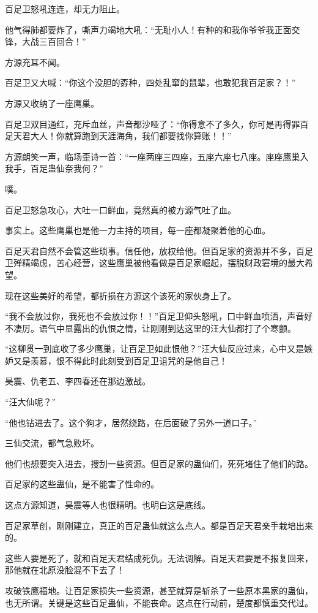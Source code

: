 \begin{this_body}
百足卫怒吼连连，却无力阻止。

他气得肺都要炸了，嘶声力竭地大吼：“无耻小人！有种的和我你爷爷我正面交锋，大战三百回合！”

方源充耳不闻。

百足卫又大喊：“你这个没胆的孬种，四处乱窜的鼠辈，也敢犯我百足家？！”

方源又收纳了一座鹰巢。

百足卫双目通红，充斥血丝，声音都沙哑了：“你得意不了多久，你可是再得罪百足天君大人！你就算跑到天涯海角，我们都要找你算账！！”

方源朗笑一声，临场歪诗一首：“一座两座三四座，五座六座七八座。座座鹰巢入我手，百足蛊仙奈我何？”

噗。

百足卫怒急攻心，大吐一口鲜血，竟然真的被方源气吐了血。

事实上。这些鹰巢也是他一力主持的项目，每一座都凝聚着他的心血。

百足天君自然不会管这些琐事。信任他，放权给他。但百足家的资源并不多，百足卫殚精竭虑，苦心经营，这些鹰巢被他看做是百足家崛起，摆脱财政窘境的最大希望。

现在这些美好的希望，都折损在方源这个该死的家伙身上了。

“我不会放过你，我死也不会放过你！！”百足卫仰头怒吼，口中鲜血喷洒，声音好不凄厉。语气中显露出的仇恨之情，让刚刚到达这里的汪大仙都打了个寒颤。

“这柳贯一到底收了多少鹰巢，让百足卫如此恨他？”汪大仙反应过来，心中又是嫉妒又是羡慕，恨不得此时此刻受到百足卫诅咒的是他自己！

昊震、仇老五、李四春还在那边激战。

“汪大仙呢？”

“他也钻进去了。这个狗才，居然绕路，在后面破了另外一道口子。”

三仙交流，都气急败坏。

他们也想要突入进去，搜刮一些资源。但百足家的蛊仙们，死死堵住了他们的路。

百足家的这些蛊仙，是不能害了性命的。

这点方源知道，昊震等人也很精明。也明白这是底线。

百足家草创，刚刚建立，真正的百足蛊仙就这么点人。都是百足天君亲手栽培出来的。

这些人要是死了，就和百足天君结成死仇。无法调解。百足天君要是不报复回来，那他就在北原没脸混不下去了！

攻破铁鹰福地。让百足家损失一些资源，甚至就算是斩杀了一些原本黑家的蛊仙，也无所谓。关键是这些百足蛊仙，不能丧命。这点在行动前，楚度都慎重交代过。


\end{this_body}
